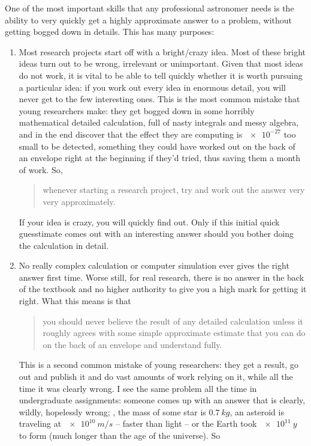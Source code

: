 One of the most important skills that any professional astronomer needs is the ability to very quickly get a highly approximate answer to a problem, without getting bogged down in details. This has many purposes:
\begin{enumerate}
\item Most research projects start off with a bright/crazy idea. Most of these bright ideas turn out to be wrong, irrelevant or unimportant. Given that most ideas do not work, it is vital to be able to tell quickly whether it is worth pursuing a particular idea: if you work out every idea in enormous detail, you will never get to the few interesting ones. This is the most common mistake that young researchers make: they get bogged down in some horribly mathematical detailed calculation, full of nasty integrals and messy algebra, and in the end discover that the effect they are computing is $\num{e-27}$ too small to be detected, something they could have worked out on the back of an envelope right at the beginning if they'd tried, thus saving them a month of work. So, 
%
\begin{quote}
whenever starting a research project, try and work out the answer very very approximately. 
\end{quote}
%
If your idea is crazy, you will quickly find out. Only if this initial quick guesstimate comes out with an interesting answer should you bother doing the calculation in detail.
%
\item No really complex calculation or computer simulation ever gives the right answer first time. Worse still, for real research, there is no answer in the back of the textbook and no higher authority to give you a high mark for getting it right. What this means is that 
%
\begin{quote}
you should never believe the result of any detailed calculation unless it roughly agrees with some simple approximate estimate that you can do on the back of an envelope and understand fully.
\end{quote}
%
This is a second common mistake of young researchers: they get a result, go out and publish it and do vast amounts of work relying on it, while all the time it was clearly wrong. I see the same problem all the time in undergraduate assignments: someone comes up with an answer that is clearly, wildly, hopelessly wrong; \eg, the mass of some star is $\SI{0.7}{kg}$, an asteroid is traveling at $\SI{e10}{m/s}$ -- faster than light -- or the Earth took $\SI{e11}{y}$ to form (much longer than the age of the universe). So 

\end{enumerate}
